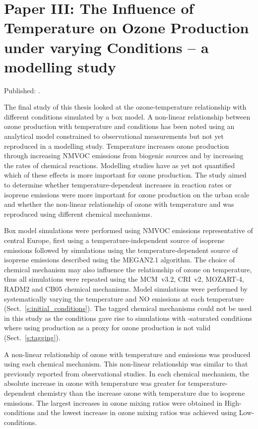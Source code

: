 \singlespacing
\section[Paper III]{Paper III: The Influence of Temperature on Ozone Production under varying  Conditions -- a modelling study} \label{s:T-O3_results}
\onehalfspacing

Published: .
\vspace{5mm}

The final study of this thesis looked at the ozone-temperature relationship with different  conditions simulated by a box model.
A non-linear relationship between ozone production with temperature and  conditions has been noted using an analytical model constrained to observational measurements but not yet reproduced in a modelling study.
Temperature increases ozone production through increasing NMVOC emissions from biogenic sources and by increasing the rates of chemical reactions.
Modelling studies have as yet not quantified which of these effects is more important for ozone production.
The study aimed to determine whether temperature-dependent increases in reaction rates or isoprene emissions were more important for ozone production on the urban scale and whether the non-linear relationship of ozone with temperature and  was reproduced using different chemical mechanisms.

Box model simulations were performed using NMVOC emissions representative of central Europe, first using a temperature-independent source of isoprene emissions followed by simulations using the temperature-dependent source of isoprene emissions described using the MEGAN2.1 algorithm.
The choice of chemical mechanism may also influence the relationship of ozone on temperature, thus all simulations were repeated using the MCM~v3.2, CRI~v2, MOZART-4, RADM2 and CB05 chemical mechanisms.
Model simulations were performed by systematically varying the temperature and NO emissions at each temperature (Sect.~\ref{s:initial_conditions}).
The tagged chemical mechanisms could not be used in this study as the  conditions gave rise to simulations with -saturated conditions where using  production as a proxy for ozone production is not valid (Sect.~\ref{s:tagging}).

A non-linear relationship of ozone with temperature and  emissions was produced using each chemical mechanism. 
This non-linear relationship was similar to that previously reported from observational studies.  
In each chemical mechanism, the absolute increase in ozone with temperature was greater for temperature-dependent chemistry than the increase ozone with temperature due to isoprene emissions.
The largest increases in ozone mixing ratios were obtained in High- conditions and the lowest increase in ozone mixing ratios was achieved using Low- conditions.

